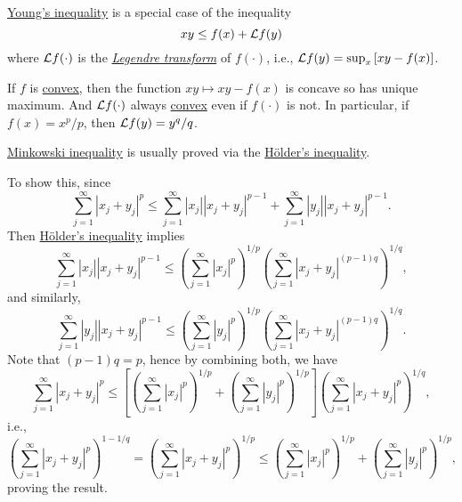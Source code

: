 \begin{remark}
	\href{https://en.wikipedia.org/wiki/Young's_inequality_for_products}{Young's inequality} is a special case of the inequality
	\[
		xy \leq f(x) + \mathcal{\MakeUppercase{l}} f(y)
	\]
	where \(\mathcal{\MakeUppercase{l}} f(\cdot)\) is the \href{https://en.wikipedia.org/wiki/Legendre_transformation}{\emph{Legendre transform}} of \(f(\cdot)\), i.e., \(\mathcal{\MakeUppercase{l}} f(y) = \sup _x \left[ xy - f(x) \right]\).

	If \(f\) is \hyperref[def:convex-function]{convex}, then the function \(xy\mapsto xy - f(x)\) is concave so has unique maximum. And \(\mathcal{\MakeUppercase{l}} f(\cdot)\) always \hyperref[def:convex-function]{convex} even if \(f(\cdot)\) is not. In particular, if \(f(x) = x^p / p\), then \(\mathcal{\MakeUppercase{l}} f(y) = y^q / q\).
\end{remark}

\begin{note}
	\hyperref[lma:Minkowski-ineq]{Minkowski inequality} is usually proved via the \hyperref[lma:Holder-ineq]{Hölder's inequality}.
\end{note}
\begin{explanation}
	To show this, since
	\[
		\sum_{j=1}^{\infty} \left\vert x_j + y_j \right\vert ^p \leq \sum_{j=1}^{\infty} \left\vert x_{j}  \right\vert \left\vert x_{j} +y_{j}  \right\vert ^{p - 1} + \sum_{j=1}^{\infty} \left\vert y_{j}  \right\vert \left\vert x_{j} +y_{j}  \right\vert ^{p-1}.
	\]
	Then \hyperref[lma:Holder-ineq]{Hölder's inequality} implies
	\[
		\sum_{j=1}^{\infty} \left\vert x_{j}  \right\vert \left\vert x_{j} + y_{j}  \right\vert ^{p-1}\leq \left( \sum_{j=1}^{\infty} \left\vert x_{j}  \right\vert^p \right) ^{1 / p} \left( \sum_{j=1}^{\infty} \left\vert x_{j} +y_{j}  \right\vert^{(p - 1)q}  \right) ^{1 / q},
	\]
	and similarly,
	\[
		\sum_{j=1}^{\infty} \left\vert y_{j}  \right\vert \left\vert x_{j} + y_{j}  \right\vert ^{p-1}\leq \left( \sum_{j=1}^{\infty} \left\vert y_{j}  \right\vert^p \right) ^{1 / p} \left( \sum_{j=1}^{\infty} \left\vert x_{j} +y_{j}  \right\vert^{(p - 1)q}  \right) ^{1 / q}.
	\]
	Note that \((p-1)q = p\), hence by combining both, we have
	\[
		\sum_{j=1}^{\infty} \left\vert x_j + y_j \right\vert ^p \leq
		\left[ \left( \sum_{j=1}^{\infty} \left\vert x_{j}  \right\vert^p \right) ^{1 / p}
			+ \left( \sum_{j=1}^{\infty} \left\vert y_{j}  \right\vert^p \right) ^{1 / p} \right] \left( \sum_{j=1}^{\infty} \left\vert x_{j} +y_{j}  \right\vert^{p}  \right) ^{1 / q},
	\]
	i.e.,
	\[
		\left( \sum_{j=1}^{\infty} \left\vert x_j + y_j \right\vert ^p \right) ^{1 - 1 / q}
		= \left( \sum_{j=1}^{\infty} \left\vert x_j + y_j \right\vert ^p \right) ^{1 / p}
		\leq
		\left( \sum_{j=1}^{\infty} \left\vert x_{j}  \right\vert^p \right) ^{1 / p}
		+ \left( \sum_{j=1}^{\infty} \left\vert y_{j}  \right\vert^p \right) ^{1 / p},
	\]
	proving the result.
\end{explanation}

